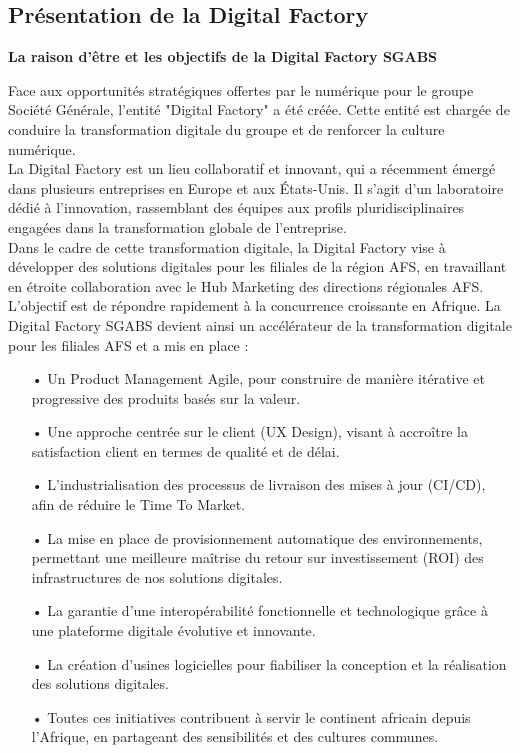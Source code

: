 \newpage

\subsection{Présentation de la Digital Factory}
\textbf{\large{La raison d'être et les objectifs de la Digital Factory SGABS}}

\medskip
Face aux opportunités stratégiques offertes par le numérique pour le groupe Société Générale, l'entité "Digital Factory" a été créée. Cette entité est chargée de conduire la transformation digitale du groupe et de renforcer la culture numérique.\\

La Digital Factory est un lieu collaboratif et innovant, qui a récemment émergé dans plusieurs entreprises en Europe et aux États-Unis. Il s'agit d'un laboratoire dédié à l'innovation, rassemblant des équipes aux profils pluridisciplinaires engagées dans la transformation globale de l'entreprise.\\

Dans le cadre de cette transformation digitale, la Digital Factory vise à développer des solutions digitales pour les filiales de la région AFS, en travaillant en étroite collaboration avec le Hub Marketing des directions régionales AFS. L'objectif est de répondre rapidement à la concurrence croissante en Afrique. La Digital Factory SGABS devient ainsi un accélérateur de la transformation digitale pour les filiales AFS et a mis en place :

\begin{itemize}
    \item[•] Un Product Management Agile, pour construire de manière itérative et progressive des produits basés sur la valeur.
    \item[•] Une approche centrée sur le client (UX Design), visant à accroître la satisfaction client en termes de qualité et de délai.
    \item[•] L'industrialisation des processus de livraison des mises à jour (CI/CD), afin de réduire le Time To Market.
    \item[•] La mise en place de provisionnement automatique des environnements, permettant une meilleure maîtrise du retour sur investissement (ROI) des infrastructures de nos solutions digitales.
    \item[•] La garantie d'une interopérabilité fonctionnelle et technologique grâce à une plateforme digitale évolutive et innovante.
    \item[•] La création d'usines logicielles pour fiabiliser la conception et la réalisation des solutions digitales.
    \item[•] Toutes ces initiatives contribuent à servir le continent africain depuis l'Afrique, en partageant des sensibilités et des cultures communes.\\
\end{itemize}

